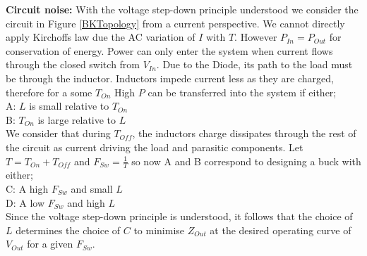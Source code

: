 \documentclass[letterpaper,twocolumn,10pt]{article}
\begin{document}
\textbf{Circuit noise: }With the voltage step-down principle understood we consider the circuit in Figure \ref{BKTopology} from a current perspective. We cannot directly apply Kirchoffs law due the AC variation of $I$ with $T$. However $P_{In} = P_{Out}$ for conservation of energy. Power can only enter the system when current flows through the closed switch from $V_{In}$. Due to the Diode, its path to the load must be through the inductor. Inductors impede current less as they are charged, therefore for a some $T_{On}$ High $P$ can be transferred into the system if either;\\
A: $L$ is small relative to $T_{On}$\\
B: $T_{On}$ is large relative to $L$\\
We consider that during $T_{Off}$, the inductors charge dissipates through the rest of the circuit as current driving the load and parasitic components. Let $T = T_{On}+T_{Off}$ and $F_{Sw} = \frac{1}{T}$ so now A and B correspond to designing a buck with either;\\
C: A high $F_{Sw}$ and small $L$\\
D: A low $F_{Sw}$ and high $L$\\
Since the voltage step-down principle is understood, it follows that the choice of $L$ determines the choice of $C$ to minimise $Z_{Out}$ at the desired operating curve of $V_{Out}$ for a given $F_{Sw}$.\\
\end{document}
